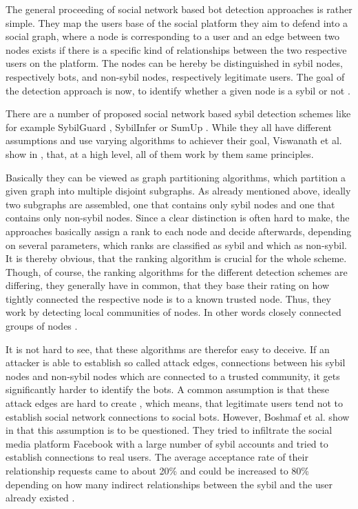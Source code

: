 The general proceeding of social network based bot detection approaches is rather simple. They map the users base of the social platform they aim to defend into a social graph, where a node is corresponding to a user and an edge between two nodes exists if there is a specific kind of relationships between the two respective users on the platform. The nodes can be hereby be distinguished in sybil nodes, respectively bots, and non-sybil nodes, respectively legitimate users. The goal of the detection approach is now, to identify whether a given node is a sybil or not \cite{comparison}.

There are a number of proposed social network based sybil detection schemes like for example SybilGuard \cite{sybilguard}, SybilInfer \cite{sybilinfer} or SumUp \cite{sumup}. While they all have different assumptions and use varying algorithms to achiever their goal, Viswanath et al. show in \cite{comparison}, that, at a high level, all of them work by them same principles.

Basically they can be viewed as graph partitioning algorithms, which partition a given graph into multiple disjoint subgraphs. As already mentioned above, ideally two subgraphs are assembled, one that contains only sybil nodes and one that contains only non-sybil nodes. Since a clear distinction is often hard to make, the approaches basically assign a rank to each node and decide afterwards, depending on several parameters, which ranks are classified as sybil and which as non-sybil. It is thereby obvious, that the ranking algorithm is crucial for the whole scheme. Though, of course, the ranking algorithms for the different detection schemes are differing, they generally have in common, that they base their rating on how tightly connected the respective node is to a known trusted node. Thus, they work by detecting local communities of nodes. In other words closely connected groups of nodes \cite{comparison}.

It is not hard to see, that these algorithms are therefor easy to deceive. If an attacker is able to establish so called attack edges, connections between his sybil nodes and non-sybil nodes which are connected to a trusted community, it gets significantly harder to identify the bots. A common assumption is that these attack edges are hard to create \cite{sybilguard}, which means, that legitimate users tend not to establish social network connections to social bots. However, Boshmaf et al. show in \cite{boshmaf11} that this assumption is to be questioned. 
They tried to infiltrate the social media platform Facebook with a large number of sybil accounts and tried to establish connections to real users. The average acceptance rate of their relationship requests came to about 20\% and could be increased to 80\% depending on how many indirect relationships between the sybil and the user already existed \cite{boshmaf11}. %

